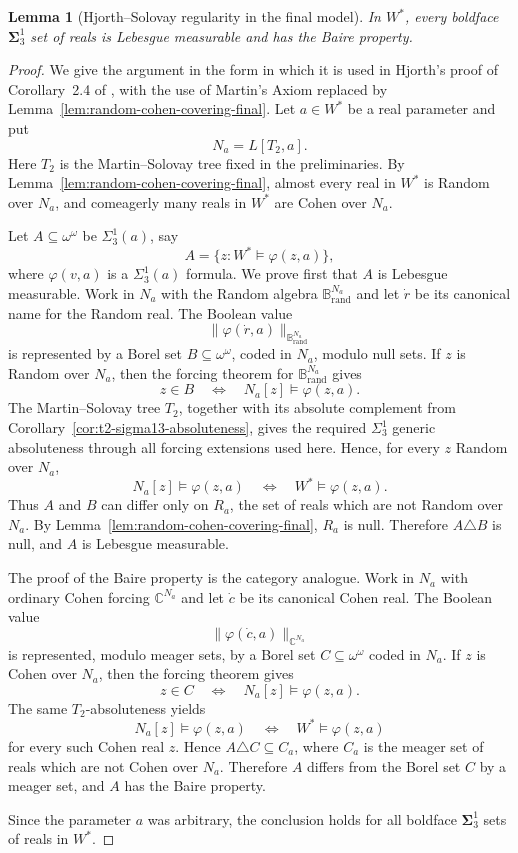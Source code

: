 \documentclass[a4paper,11pt]{article}
\newtheorem{lemma}[theorem]{Lemma}
\begin{document}
\begin{lemma}[Hjorth--Solovay regularity in the final model]\label{lem:sigma13-regularity-final}
In $W^\ast$, every boldface $\boldsymbol{\Sigma}^1_3$ set of reals is Lebesgue measurable and has the Baire property.
\end{lemma}

\begin{proof}
We give the argument in the form in which it is used in Hjorth's proof of Corollary~2.4 of \cite{Hjorth}, with the use of Martin's Axiom replaced by Lemma~\ref{lem:random-cohen-covering-final}.  Let $a\in W^\ast$ be a real parameter and put
\[
   N_a=L[T_2,a].
\]
Here $T_2$ is the Martin--Solovay tree fixed in the preliminaries.  By Lemma~\ref{lem:random-cohen-covering-final}, almost every real in $W^\ast$ is Random over $N_a$, and comeagerly many reals in $W^\ast$ are Cohen over $N_a$.

Let $A\subseteq\omega^\omega$ be $\Sigma^1_3(a)$, say
\[
   A=\{z: W^\ast\models\varphi(z,a)\},
\]
where $\varphi(v,a)$ is a $\Sigma^1_3(a)$ formula.  We prove first that $A$ is Lebesgue measurable.  Work in $N_a$ with the Random algebra $\mathbb B_{\mathrm{rand}}^{N_a}$ and let $\dot r$ be its canonical name for the Random real.  The Boolean value
\[
   \|\varphi(\dot r,a)\|_{\mathbb B_{\mathrm{rand}}^{N_a}}
\]
is represented by a Borel set $B\subseteq\omega^\omega$, coded in $N_a$, modulo null sets.  If $z$ is Random over $N_a$, then the forcing theorem for $\mathbb B_{\mathrm{rand}}^{N_a}$ gives
\[
   z\in B
   \quad\Longleftrightarrow\quad
   N_a[z]\models\varphi(z,a).
\]
The Martin--Solovay tree $T_2$, together with its absolute complement from Corollary~\ref{cor:t2-sigma13-absoluteness}, gives the required $\Sigma^1_3$ generic absoluteness through all forcing extensions used here.  Hence, for every $z$ Random over $N_a$,
\[
   N_a[z]\models\varphi(z,a)
   \quad\Longleftrightarrow\quad
   W^\ast\models\varphi(z,a).
\]
Thus $A$ and $B$ can differ only on $R_a$, the set of reals which are not Random over $N_a$.  By Lemma~\ref{lem:random-cohen-covering-final}, $R_a$ is null.  Therefore $A\triangle B$ is null, and $A$ is Lebesgue measurable.

The proof of the Baire property is the category analogue.  Work in $N_a$ with ordinary Cohen forcing $\mathbb C^{N_a}$ and let $\dot c$ be its canonical Cohen real.  The Boolean value
\[
   \|\varphi(\dot c,a)\|_{\mathbb C^{N_a}}
\]
is represented, modulo meager sets, by a Borel set $C\subseteq\omega^\omega$ coded in $N_a$.  If $z$ is Cohen over $N_a$, then the forcing theorem gives
\[
   z\in C
   \quad\Longleftrightarrow\quad
   N_a[z]\models\varphi(z,a).
\]
The same $T_2$-absoluteness yields
\[
   N_a[z]\models\varphi(z,a)
   \quad\Longleftrightarrow\quad
   W^\ast\models\varphi(z,a)
\]
for every such Cohen real $z$.  Hence $A\triangle C\subseteq C_a$, where $C_a$ is the meager set of reals which are not Cohen over $N_a$.  Therefore $A$ differs from the Borel set $C$ by a meager set, and $A$ has the Baire property.

Since the parameter $a$ was arbitrary, the conclusion holds for all boldface $\boldsymbol{\Sigma}^1_3$ sets of reals in $W^\ast$.
\end{proof}
\end{document}

